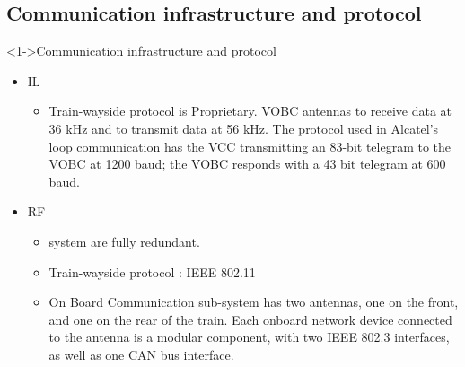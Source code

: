 \subsection{Communication infrastructure and protocol }
\frame
{
  
\begin{block}<1->{Communication infrastructure and protocol}
\begin{itemize}
\item IL \begin{itemize}
\item Train-wayside protocol is Proprietary.  VOBC antennas to receive data at 36 kHz and to transmit data at 56 kHz.  The protocol used in Alcatel's loop communication has the VCC transmitting an 83-bit telegram to the VOBC at 1200 baud; the VOBC responds with a 43 bit telegram at 600 baud.  

\end{itemize}

\item RF \begin{itemize}
\item system are fully redundant.
\item Train-wayside protocol : IEEE 802.11
\item On Board Communication sub-system has two antennas, one on the front, and one on the rear of the train. Each onboard network device connected to the antenna is a modular component, with two IEEE 802.3 interfaces, as well as one CAN bus interface.
\end{itemize}


\end{itemize}

     




\end{block}


}


